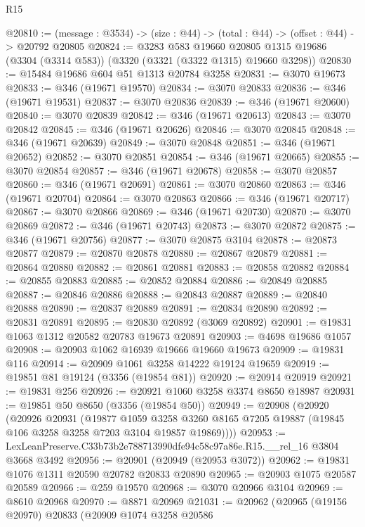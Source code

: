 \begin{lexlean}{R15}
\begin{coremodule}
@20810 := (message : @3534) -> (size : @44) -> (total : @44) -> (offset : @44) -> @20792 @20805
@20824 := @3283
    @583
    @19660
    @20805
    @1315
    @19686
    (@3304 (@3314 @583))
    (@3320 (@3321 (@3322 @1315) @19660 @3298))
@20830 := @15484 @19686 @604 @51 @1313 @20784 @3258
@20831 := @3070 @19673
@20833 := @346 (@19671 @19570)
@20834 := @3070 @20833
@20836 := @346 (@19671 @19531)
@20837 := @3070 @20836
@20839 := @346 (@19671 @20600)
@20840 := @3070 @20839
@20842 := @346 (@19671 @20613)
@20843 := @3070 @20842
@20845 := @346 (@19671 @20626)
@20846 := @3070 @20845
@20848 := @346 (@19671 @20639)
@20849 := @3070 @20848
@20851 := @346 (@19671 @20652)
@20852 := @3070 @20851
@20854 := @346 (@19671 @20665)
@20855 := @3070 @20854
@20857 := @346 (@19671 @20678)
@20858 := @3070 @20857
@20860 := @346 (@19671 @20691)
@20861 := @3070 @20860
@20863 := @346 (@19671 @20704)
@20864 := @3070 @20863
@20866 := @346 (@19671 @20717)
@20867 := @3070 @20866
@20869 := @346 (@19671 @20730)
@20870 := @3070 @20869
@20872 := @346 (@19671 @20743)
@20873 := @3070 @20872
@20875 := @346 (@19671 @20756)
@20877 := @3070 @20875 @3104
@20878 := @20873 @20877
@20879 := @20870 @20878
@20880 := @20867 @20879
@20881 := @20864 @20880
@20882 := @20861 @20881
@20883 := @20858 @20882
@20884 := @20855 @20883
@20885 := @20852 @20884
@20886 := @20849 @20885
@20887 := @20846 @20886
@20888 := @20843 @20887
@20889 := @20840 @20888
@20890 := @20837 @20889
@20891 := @20834 @20890
@20892 := @20831 @20891
@20895 := @20830 @20892 (@3069 @20892)
@20901 := @19831 @1063 @1312 @20582 @20783 @19673 @20891
@20903 := @4698 @19686 @1057
@20908 := @20903 @1062 @16939 @19666 @19660 @19673
@20909 := @19831 @116
@20914 := @20909 @1061 @3258 @14222 @19124 @19659
@20919 := @19851 @81 @19124 (@3356 (@19854 @81))
@20920 := @20914 @20919
@20921 := @19831 @256
@20926 := @20921 @1060 @3258 @3374 @8650 @18987
@20931 := @19851 @50 @8650 (@3356 (@19854 @50))
@20949 := @20908
    (@20920
      (@20926
        @20931
        (@19877
          @1059
          @3258
          @3260
          @8165
          @7205
          @19887
          (@19845 @106 @3258 @3258 @7203 @3104 @19857 @19869))))
@20953 := LexLeanPreserve.C33b73b2e788713990dfe94c58c97a86e.R15.__rel_16 @3804 @3668 @3492
@20956 := @20901 (@20949 (@20953 @3072))
@20962 := @19831 @1076 @1311 @20590 @20782 @20833 @20890
@20965 := @20903 @1075 @20587 @20589
@20966 := @259 @19570
@20968 := @3070 @20966 @3104
@20969 := @8610 @20968
@20970 := @8871 @20969
@21031 := @20962
    (@20965
      (@19156 @20970)
      @20833
      (@20909
        @1074
        @3258
        @20586

\end{coremodule}
\end{lexlean}
